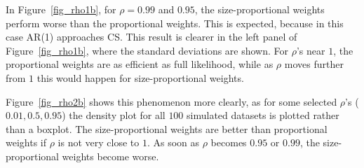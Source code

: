\documentclass[11pt,a5paper,twoside]{book}
\begin{document}
{In Figure~\ref{fig_rho1b}, for $\rho=0.99$ and $0.95$, the size-proportional weights perform  worse than the proportional weights. This is expected, because in this case AR(1) approaches CS. This result is clearer in the left panel of Figure~\ref{fig_rho1b}, where the standard deviations are shown. For $\rho$'s near $1$, the proportional weights are as efficient as  full likelihood, while as $\rho$ moves further from $1$ this would happen for size-proportional weights.

Figure~\ref{fig_rho2b} shows this phenomenon more clearly, as for some selected $\rho$'s ($0.01,0.5,0.95$) the density plot for all $100$ simulated datasets is plotted rather than a  boxplot. The size-proportional weights are better than proportional weights if $\rho$ is not very close to $1$. As soon as $\rho$ becomes $0.95$ or $0.99$, the size-proportional weights become worse.


}
\end{document}
